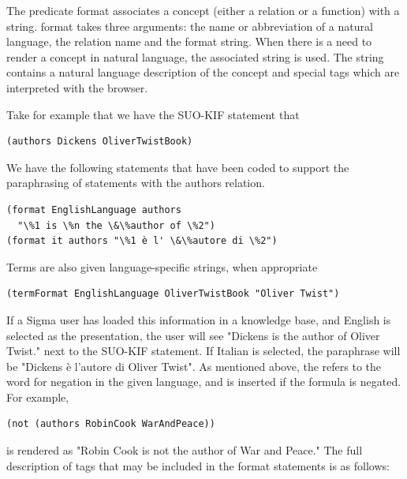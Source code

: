 \documentclass{book}
\begin{document}
The predicate format associates a concept (either a relation or a function) with
a string.  format takes three arguments: the name or abbreviation of a natural
language, the relation name and the format string.  When there is a need to
render a concept in natural language, the associated string is used.  The string
contains a natural language description of the concept and special tags which
are interpreted with the browser.

Take for example that we have the SUO-KIF statement that

\begin{verbatim}
(authors Dickens OliverTwistBook)
\end{verbatim}

We have the following statements that have been coded to support the
paraphrasing of statements with the authors relation.

\begin{verbatim}
(format EnglishLanguage authors 
  "\%1 is \%n the \&\%author of \%2")
(format it authors "\%1 è l' \&\%autore di \%2")
\end{verbatim}

Terms are also given language-specific strings, when appropriate

\begin{verbatim}
(termFormat EnglishLanguage OliverTwistBook "Oliver Twist")
\end{verbatim}

If a Sigma user has loaded this information in a knowledge base, and English is
selected as the presentation, the user will see "Dickens is the author of Oliver
Twist." next to the SUO-KIF statement.  If Italian is selected, the paraphrase
will be "Dickens è l'autore di Oliver Twist".  As mentioned above, the %
refers to the word for negation in the given language, and is inserted if the
formula is negated.  For example,

\begin{verbatim}
(not (authors RobinCook WarAndPeace))
\end{verbatim}

is rendered as "Robin Cook is not the author of War and Peace." The full
description of tags that may be included in the format statements is as follows:
\end{document}
